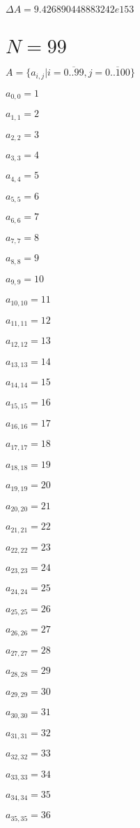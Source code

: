 \documentclass[a4paper,12pt]{article}
\begin{document}
$\Delta A = 9.426890448883242e153$



\section{ $N = 99$ }
$A = \{ a _{ i, j } | i = \overline { 0..99 }, j = \overline { 0..100 } \}$

$a _{ 0, 0 } = 1$

$a _{ 1, 1 } = 2$

$a _{ 2, 2 } = 3$

$a _{ 3, 3 } = 4$

$a _{ 4, 4 } = 5$

$a _{ 5, 5 } = 6$

$a _{ 6, 6 } = 7$

$a _{ 7, 7 } = 8$

$a _{ 8, 8 } = 9$

$a _{ 9, 9 } = 10$

$a _{ 10, 10 } = 11$

$a _{ 11, 11 } = 12$

$a _{ 12, 12 } = 13$

$a _{ 13, 13 } = 14$

$a _{ 14, 14 } = 15$

$a _{ 15, 15 } = 16$

$a _{ 16, 16 } = 17$

$a _{ 17, 17 } = 18$

$a _{ 18, 18 } = 19$

$a _{ 19, 19 } = 20$

$a _{ 20, 20 } = 21$

$a _{ 21, 21 } = 22$

$a _{ 22, 22 } = 23$

$a _{ 23, 23 } = 24$

$a _{ 24, 24 } = 25$

$a _{ 25, 25 } = 26$

$a _{ 26, 26 } = 27$

$a _{ 27, 27 } = 28$

$a _{ 28, 28 } = 29$

$a _{ 29, 29 } = 30$

$a _{ 30, 30 } = 31$

$a _{ 31, 31 } = 32$

$a _{ 32, 32 } = 33$

$a _{ 33, 33 } = 34$

$a _{ 34, 34 } = 35$

$a _{ 35, 35 } = 36$
\end{document}
